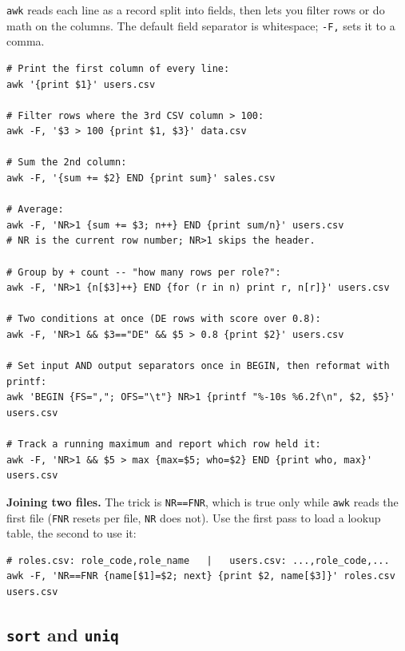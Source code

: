 \documentclass[11pt,a4paper]{article}
\begin{document}
\texttt{awk} reads each line as a record split into fields, then
lets you filter rows or do math on the columns. The default field
separator is whitespace; \texttt{-F,} sets it to a comma.

\begin{lstlisting}[style=bashstyle]
# Print the first column of every line:
awk '{print $1}' users.csv

# Filter rows where the 3rd CSV column > 100:
awk -F, '$3 > 100 {print $1, $3}' data.csv

# Sum the 2nd column:
awk -F, '{sum += $2} END {print sum}' sales.csv

# Average:
awk -F, 'NR>1 {sum += $3; n++} END {print sum/n}' users.csv
# NR is the current row number; NR>1 skips the header.

# Group by + count -- "how many rows per role?":
awk -F, 'NR>1 {n[$3]++} END {for (r in n) print r, n[r]}' users.csv

# Two conditions at once (DE rows with score over 0.8):
awk -F, 'NR>1 && $3=="DE" && $5 > 0.8 {print $2}' users.csv

# Set input AND output separators once in BEGIN, then reformat with printf:
awk 'BEGIN {FS=","; OFS="\t"} NR>1 {printf "%-10s %6.2f\n", $2, $5}' users.csv

# Track a running maximum and report which row held it:
awk -F, 'NR>1 && $5 > max {max=$5; who=$2} END {print who, max}' users.csv
\end{lstlisting}

\textbf{Joining two files.} The trick is \texttt{NR==FNR}, which is
true only while \texttt{awk} reads the first file (\texttt{FNR} resets
per file, \texttt{NR} does not). Use the first pass to load a lookup
table, the second to use it:

\begin{lstlisting}[style=bashstyle]
# roles.csv: role_code,role_name   |   users.csv: ...,role_code,...
awk -F, 'NR==FNR {name[$1]=$2; next} {print $2, name[$3]}' roles.csv users.csv
\end{lstlisting}

\subsection*{\texttt{sort} and \texttt{uniq}}
\end{document}
